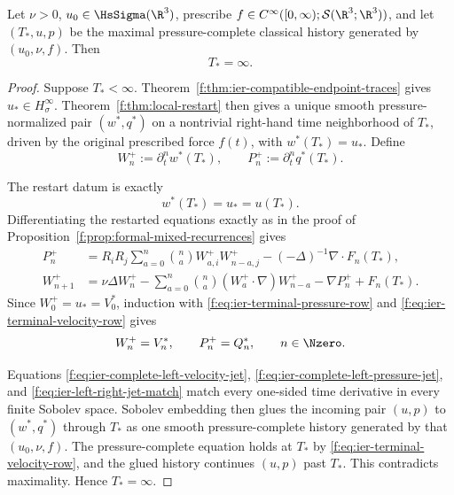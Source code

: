 \begin{theorem}
\label{f:thm:ier-same-history-restart}
Let \(\nu>0\), \(u_0\in\HsSigma(\R^3)\), prescribe
\(f\in C^\infty([0,\infty);\mathcal S(\R^3;\R^3))\), and let
\((T_*,u,p)\) be the maximal pressure-complete classical history generated
by \((u_0,\nu,f)\).  Then
\begin{equation}
 T_*=\infty.
 \label{f:eq:ier-maximal-time-infinite}
\end{equation}
\end{theorem}

\begin{proof}
Suppose \(T_*<\infty\).  Theorem~\ref{f:thm:ier-compatible-endpoint-traces}
gives \(u_*\in H^\infty_\sigma\).  Theorem~\ref{f:thm:local-restart} then
gives a unique smooth pressure-normalized pair \((w^*,q^*)\) on a nontrivial
right-hand time neighborhood of \(T_*\), driven by the original prescribed
force \(f(t)\), with \(w^*(T_*)=u_*\).  Define
\[
 W_n^+:=\partial_t^nw^*(T_*),
 \qquad
 P_n^+:=\partial_t^nq^*(T_*).
\]
\begin{samepage}
The restart datum is exactly
\[
 w^*(T_*)=u_*=u(T_*).
\]
Differentiating the restarted equations exactly as in the proof of
Proposition~\ref{f:prop:formal-mixed-recurrences} gives
\begin{align*}
 P_n^+&=R_iR_j\sum_{a=0}^{n}\binom naW_{a,i}^+W_{n-a,j}^+
 -(-\Delta)^{-1}\nabla\cdot F_n(T_*),\\
 W_{n+1}^+&=\nu\Delta W_n^+
 -\sum_{a=0}^{n}\binom na(W_a^+\cdot\nabla)W_{n-a}^+
 -\nabla P_n^++F_n(T_*).
\end{align*}
Since \(W_0^+=u_*=V_0^*\), induction with
\eqref{f:eq:ier-terminal-pressure-row} and
\eqref{f:eq:ier-terminal-velocity-row} gives
\begin{equation}
 W_n^+=V_n^*,
 \qquad P_n^+=Q_n^*,
 \qquad n\in\Nzero.
 \label{f:eq:ier-left-right-jet-match}
\end{equation}
\par
\end{samepage}

Equations \eqref{f:eq:ier-complete-left-velocity-jet},
\eqref{f:eq:ier-complete-left-pressure-jet}, and
\eqref{f:eq:ier-left-right-jet-match} match every one-sided time derivative in
every finite Sobolev space.  Sobolev embedding then glues the incoming
pair \((u,p)\) to \((w^*,q^*)\) through \(T_*\) as one smooth
pressure-complete history generated by that \((u_0,\nu,f)\).  The
pressure-complete equation holds at \(T_*\) by
\eqref{f:eq:ier-terminal-velocity-row}, and the glued history continues
\((u,p)\) past \(T_*\).  This contradicts maximality.  Hence
\(T_*=\infty\).
\end{proof}


